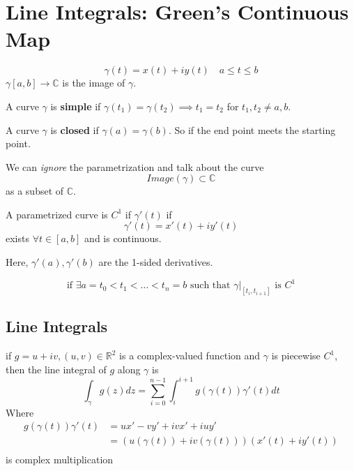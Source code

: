 \chapter{Line Integrals: Green's Continuous  Map}
\begin{theorem}
    $$ \gamma (t) = x(t) + iy(t) \quad a \leq t \leq b $$
    $\gamma [a,b] \to \mathbb{C}$ is the image of $\gamma$.
\end{theorem}

\begin{definition}
    A curve $\gamma$ is \textbf{simple} if $\gamma(t_1) = \gamma(t_2) \implies t_1 = t_2$ for $t_1, t_2 \neq a, b$.
\end{definition}
\begin{definition}
    A curve $\gamma$ is \textbf{closed} if $\gamma(a) = \gamma(b)$. So if the end point meets the starting point.
\end{definition}

\begin{remark}
    We can \textit{ignore} the parametrization and talk about the curve $$Image(\gamma) \subset \mathbb{C}$$ as a subset of $\mathbb{C}$.
\end{remark}

\begin{definition}
    A parametrized curve is $C^1$ if $\gamma'(t)$ if
    $$\gamma '(t) = x'(t) + iy'(t)$$ exists $\forall t \in [a,b]$ and is continuous.
\end{definition}

\begin{remark}
    Here, $\gamma'(a), \gamma'(b)$ are the 1-sided derivatives.
\end{remark}

\begin{definition}
    $$\text{if } \exists a = t_0 < t_1 < \ldots < t_n = b \text{ such that } \gamma |_{[t_i, t_{i+1}]} \text{ is } C^1$$
\end{definition}

\section{Line Integrals}
\begin{definition}
    if $g = u + iv, (u,v) \in \mathbb{R}^2$ is a complex-valued function and $\gamma$ is piecewise $C^1$, then the line integral of $g$ along $\gamma$ is
    $$\int_{\gamma} g(z) dz = \sum_{i=0}^{n-1}\int_{i}^{i+1} g(\gamma(t)) \gamma'(t) dt$$
    Where
    \begin{align*}
        g(\gamma(t)) \gamma'(t) & = ux' - vy' + ivx' + iuy'                        \\
                                & = (u(\gamma(t)) + iv(\gamma(t)))(x'(t) + iy'(t)) \\
    \end{align*}
    is complex multiplication
\end{definition}

